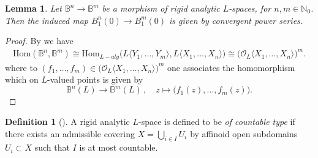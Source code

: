 \documentclass[a4paper, reqno, 10pt]{amsart}
\newtheorem{lemma}[theorem]{Lemma}
\theoremstyle{definition}
\newtheorem{definition}[theorem]{Definition}
\numberwithin{equation}{section}
\newcommand{\ev}{{\mathrm{ev}}}
\newcommand{\Hom}{{\mathrm{Hom}}}
\newcommand{\Ker}{{\mathrm{Ker}}}
\newcommand{\lra}{\longrightarrow}
\newcommand{\lto}{\longmapsto}
\newcommand{\mto}{\mapsto}
\newcommand{\ra}{\rightarrow}
\newcommand{\BB}{{\mathbb {B}}}
\newcommand{\BN}{{\mathbb {N}}}
\newcommand{\CO}{{\mathcal {O}}}
\newcommand{\Fm}{{\mathfrak {m}}}
\begin{document}
\begin{lemma}\label{Lemma 1 - Morphism between rigid analytic unit balls is given by convergent power series}
	Let $\BB^n \ra \BB^m$ be a morphism of rigid analytic $L$-spaces, for $n,m\in \BN_0$.
	Then the induced map $B_1^{n}(0) \ra B_1^{m}(0)$ is given by convergent power series.
\end{lemma}
\begin{proof}
	By \cite[6.1.1 Prop.\ 4]{BoschGuentzerRemmert84NonArchAna} we have 
	\begin{align*}
		\Hom (\BB^{n}, \BB^{m} ) \cong \Hom_{L-alg} \big(L \langle Y_1,\ldots, Y_{m} \rangle , L \langle X_1,\ldots, X_{n} \rangle \big) 
		\cong \big(\CO_L \langle X_1,\ldots, X_{n} \rangle \big)^{m} .
	\end{align*}
	where to $(f_1,\ldots, f_{m}) \in \big( \CO_L \langle X_1,\ldots, X_{n} \rangle \big)^m$ one associates the homomorphism which on $L$-valued points is given by 
	\begin{equation*}
		\BB^{n} (L) \lra \BB^{m} (L) \,,\quad z \lto \big(f_1(z),\ldots, f_{m} (z) \big) .
	\end{equation*}
\end{proof}


\begin{definition}[{\cite[Def.\ 2.5.6]{deJongvanderPut96EtaleCohomRigidAnSp}}]\label{Def 1 - Definition of rigid analytic spaces of countable type}
	A rigid analytic $L$-space is defined to be \textit{of countable type} if there exists an admissible covering $X=\bigcup_{i\in I} U_i $ by affinoid open subdomains $U_i \subset X$ such that $I$ is at most countable.
\end{definition}
\end{document}
